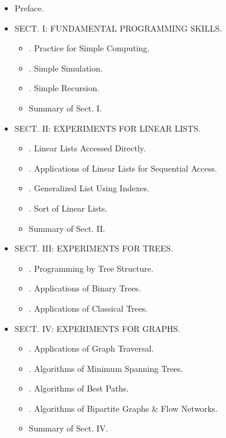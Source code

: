 \documentclass{article}
\begin{document}
\begin{itemize}
	{\sc Jian-De Wang} is a famous coach for Olympiad in Informatics in China. Under his guidance, his students have won 7 gold medals, 3 silver medals, \& 2 bronze medals for China in International Olympiad in Informatics. He has published 24 books for programming contests.
	\item {\sf Preface.}
	\item {\sf SECT. I: FUNDAMENTAL PROGRAMMING SKILLS.}
	\begin{itemize}
		\item {. Practice for Simple Computing.}
		\item {. Simple Simulation.}
		\item {. Simple Recursion.}
		\item {\sf Summary of Sect. I.}
	\end{itemize}
	\item {\sf SECT. II: EXPERIMENTS FOR LINEAR LISTS.}
	\begin{itemize}
		\item {. Linear Lists Accessed Directly.}
		\item {. Applications of Linear Lists for Sequential Access.}
		\item {. Generalized List Using Indexes.}
		\item {. Sort of Linear Lists.}
		\item {\sf Summary of Sect. II.}
	\end{itemize}
	\item {\sf SECT. III: EXPERIMENTS FOR TREES.}
	\begin{itemize}
		\item {. Programming by Tree Structure.}
		\item {. Applications of Binary Trees.}
		\item {. Applications of Classical Trees.}
	\end{itemize}
	\item {\sf SECT. IV: EXPERIMENTS FOR GRAPHS.}
	\begin{itemize}
		\item {. Applications of Graph Traversal.}
		\item {. Algorithms of Minimum Spanning Trees.}
		\item {. Algorithms of Best Paths.}
		\item {. Algorithms of Bipartite Graphs \& Flow Networks.}
		\item {\sf Summary of Sect. IV.}
	\end{itemize}
\end{itemize}
\end{document}
